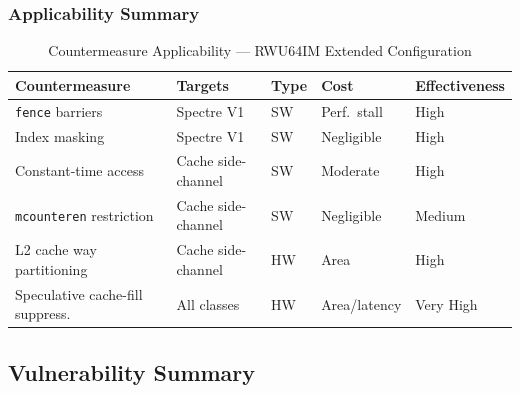 \subsubsection{Applicability Summary}

\begin{table}[h]
  \centering
  \caption{Countermeasure Applicability — RWU64IM Extended Configuration}
  \label{tab:countermeasures}
  \begin{tabular}{lllll}
    \hline
    \textbf{Countermeasure}          & \textbf{Targets}       & \textbf{Type} &
    \textbf{Cost}                    & \textbf{Effectiveness}                                            \\
    \hline
    \texttt{fence} barriers          & Spectre V1             & SW            & Perf.\ stall & High      \\
    Index masking                    & Spectre V1             & SW            & Negligible   & High      \\
    Constant-time access             & Cache side-channel     & SW            & Moderate     & High      \\
    \texttt{mcounteren} restriction  & Cache side-channel     & SW            & Negligible   & Medium    \\
    L2 cache way partitioning        & Cache side-channel     & HW            & Area         & High      \\
    Speculative cache-fill suppress. & All classes            & HW            & Area/latency & Very High \\
    \hline
  \end{tabular}
\end{table}

\subsection{Vulnerability Summary}

